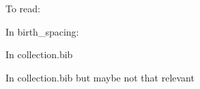 
To read:

In birth_spacing:


In collection.bib
\citep{Rafalitnanana2000} 
\citep{Rahman1993}
\citep{Jayachandran2017}
\citep{Jayachandran2017a}
\citep{Lambert2016}


In collection.bib but maybe not that relevant
\citep{Basu2010} 
\citep{dasgupta95} 
\citep{Kugler2017}


